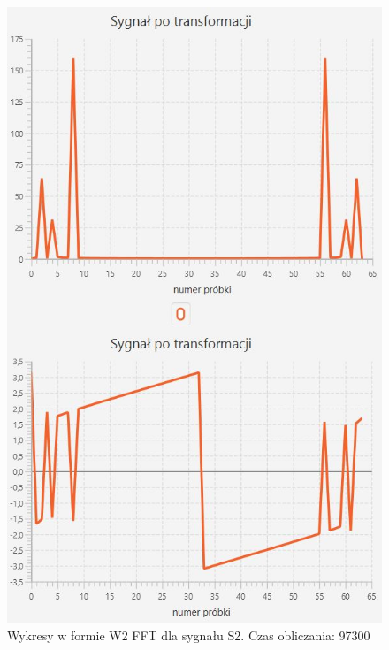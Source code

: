 \documentclass[12pt]{article}
\begin{document}
\begin{figure}[H]
	\centering
	\includegraphics[width=.8\linewidth]{FFT-S2-W2}
	\caption{ Wykresy w formie W2 FFT dla sygnału S2. Czas obliczania: 97300}
	\label{S3_sygnal}
\end{figure}
\end{document}
